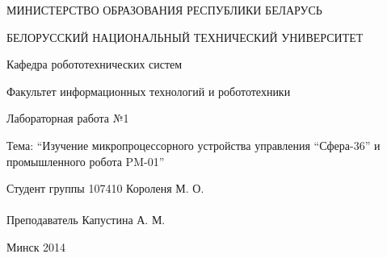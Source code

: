 \begin{titlepage} %

\thispagestyle{empty} %

\begin{center}
МИНИСТЕРСТВО ОБРАЗОВАНИЯ РЕСПУБЛИКИ БЕЛАРУСЬ

БЕЛОРУССКИЙ НАЦИОНАЛЬНЫЙ ТЕХНИЧЕСКИЙ УНИВЕРСИТЕТ

Кафедра робототехнических систем

Факультет информационных технологий и робототехники
\end{center}

\vfill

\begin{center}
Лабораторная работа №1

Тема: ``Изучение микропроцессорного устройства управления ``Сфера-36'' и промышленного робота PM-01''
\end{center}

\vfill

\noindent
Студент группы 107410 \hfill Короленя М. О.
\\
\\
\noindent
Преподаватель \hfill Капустина А. М.

\vfill

\centerline{Минск 2014}

\clearpage %

\end{titlepage}

\setcounter{page}{2}

